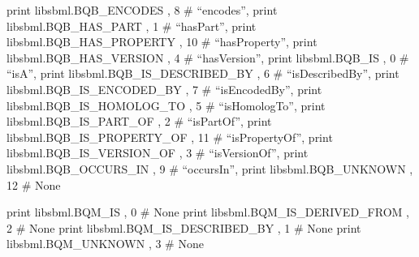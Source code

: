 \documentclass[letterpaper,12pt,english]{sphinxmanual}
\begin{document}
\begin{fulllineitems}
\label{\detokenize{api/io:cbmpy.CBXML.SBML_NS}}
\pysigstartsignatures
\pysigline
{}
\pysigstopsignatures
\sphinxAtStartPar
print libsbml.BQB\_ENCODES            , 8  \# “encodes”,
print libsbml.BQB\_HAS\_PART           , 1  \# “hasPart”,
print libsbml.BQB\_HAS\_PROPERTY       , 10 \# “hasProperty”,
print libsbml.BQB\_HAS\_VERSION        , 4  \# “hasVersion”,
print libsbml.BQB\_IS                 , 0  \# “isA”,
print libsbml.BQB\_IS\_DESCRIBED\_BY    , 6  \# “isDescribedBy”,
print libsbml.BQB\_IS\_ENCODED\_BY      , 7  \# “isEncodedBy”,
print libsbml.BQB\_IS\_HOMOLOG\_TO      , 5  \# “isHomologTo”,
print libsbml.BQB\_IS\_PART\_OF         , 2  \# “isPartOf”,
print libsbml.BQB\_IS\_PROPERTY\_OF     , 11 \# “isPropertyOf”,
print libsbml.BQB\_IS\_VERSION\_OF      , 3  \# “isVersionOf”,
print libsbml.BQB\_OCCURS\_IN          , 9  \# “occursIn”,
print libsbml.BQB\_UNKNOWN            , 12 \# None

\sphinxAtStartPar
print libsbml.BQM\_IS                 , 0 \# None
print libsbml.BQM\_IS\_DERIVED\_FROM    , 2 \# None
print libsbml.BQM\_IS\_DESCRIBED\_BY    , 1 \# None
print libsbml.BQM\_UNKNOWN            , 3 \# None

\end{fulllineitems}
\end{document}
